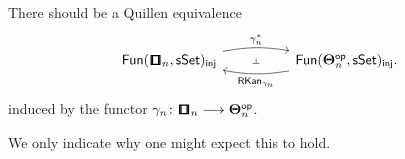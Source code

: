 \begin{conjecture} \label{fo:: conj: local.}
    There should be a Quillen equivalence
\begin{equation}
    \begin{tikzcd}[ampersand replacement=\&]
	{\fun(\cube_{n},\sset)_{\mathsf{inj}}} \&\& {\fun(\bTheta_{n}^{\op},\sset)_{\mathsf{inj}}.}
	\arrow[""{name=0, anchor=center, inner sep=0}, "{\gamma_{n}^*}", bend left=10, from=1-1, to=1-3]
	\arrow[""{name=1, anchor=center, inner sep=0}, "{\rkan_{\gamma_{n}}}", bend left=10, from=1-3, to=1-1]
	\arrow["\dashv"{anchor=center, rotate=-90}, draw=none, from=1, to=0]
\end{tikzcd}
\end{equation}
induced by the functor $\gamma_{n} \maps \cube_{n} \longra \bTheta_{n}^{\op}$.
\end{conjecture}

We only indicate why one might expect this to hold.

